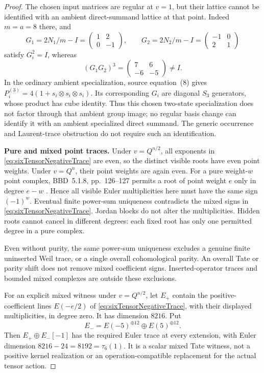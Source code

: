 \documentclass[11pt,a4paper]{article}
\theoremstyle{named}\newtheorem{finding}{Finding}[section]
\theoremstyle{definition}\newtheorem{definition}[finding]{Definition}
\theoremstyle{remark}\newtheorem{remark}[finding]{Remark}
\begin{document}
\begin{proof}
The chosen input matrices are regular at \(v=1\),
but their lattice cannot be identified with an
ambient direct-summand lattice at that point.
Indeed \(m=a=8\) there, and
\[
 G_1=2N_1/m-I=\begin{pmatrix}1&2\\0&-1\end{pmatrix},
 \qquad
 G_2=2N_2/m-I=\begin{pmatrix}-1&0\\2&1\end{pmatrix}
\]
satisfy \(G_i^2=I\), whereas
\begin{equation}\label{eq:sixTensorSpecializationBoundary}
             (G_1G_2)^3
               =\begin{pmatrix}7&6\\-6&-5\end{pmatrix}\ne I.
\end{equation}
In the ordinary ambient specialization, source
equation~(8) gives
\(P_i^{(3)}=4(1+s_i\otimes s_i\otimes s_i)\).
Its corresponding \(G_i\) are diagonal \(S_3\)
generators, whose product has cube identity.
Thus this chosen two-state specialization does
not factor through that ambient group image;
no regular basis change can identify it with
an ambient specialized direct summand.
The generic occurrence and Laurent-trace
obstruction do not require such an identification.

\par\smallskip\noindent\textbf{Pure and mixed point traces.}\quad
Under \(v=Q^{n/2}\), all exponents in
\eqref{eq:sixTensorNegativeTrace} are even, so
the distinct visible roots have even point weights.
Under \(v=Q^n\), their point weights are again
even. For a pure weight-\(w\) point complex,
BBD~5.1.8, pp.~126--127 permits a root of
point weight \(e\) only in degree \(e-w\)
\cite{BBD}. Hence all visible Euler multiplicities
here must have the same sign \((-1)^w\).
Eventual finite power-sum uniqueness contradicts
the mixed signs in
\eqref{eq:sixTensorNegativeTrace}.
Jordan blocks do not alter the multiplicities.
Hidden roots cannot cancel in different degrees:
each fixed root has only one permitted degree
in a pure complex.

Even without purity, the same power-sum uniqueness
excludes a genuine finite uninserted Weil trace,
or a single overall cohomological parity.
An overall Tate or parity shift does not
remove mixed coefficient signs.
Inserted-operator traces and bounded mixed
complexes are outside these exclusions.

For an explicit mixed witness under
\(v=Q^{n/2}\), let \(E_+\) contain the
positive-coefficient lines \(E(-e/2)\) of
\eqref{eq:sixTensorNegativeTrace}, with their
displayed multiplicities, in degree zero.
It has dimension \(8216\).
Put
\[
 E_-=E(-5)^{\oplus12}\oplus E(5)^{\oplus12}.
\]
Then \(E_+\oplus E_-[-1]\) has the required
Euler trace at every extension, with Euler
dimension \(8216-24=8192=\tau_6(1)\).
It is a scalar mixed Tate witness, not a
positive kernel realization or an
operation-compatible replacement for the
actual tensor action.
\end{proof}
\end{document}
